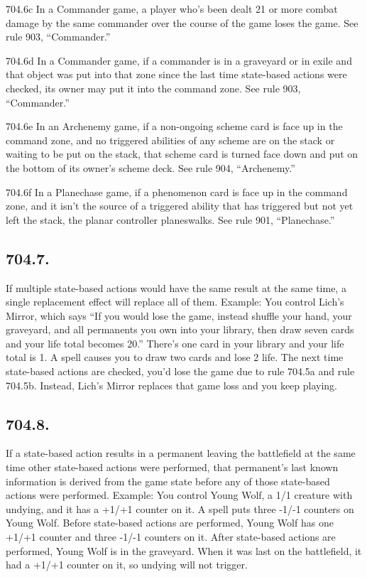 704.6c In a Commander game, a player who’s been dealt 21 or more combat damage by the same commander over the course of the game loses the game. See rule 903, “Commander.”

704.6d In a Commander game, if a commander is in a graveyard or in exile and that object was put into that zone since the last time state-based actions were checked, its owner may put it into the command zone. See rule 903, “Commander.”

704.6e In an Archenemy game, if a non-ongoing scheme card is face up in the command zone, and no triggered abilities of any scheme are on the stack or waiting to be put on the stack, that scheme card is turned face down and put on the bottom of its owner’s scheme deck. See rule 904, “Archenemy.”

704.6f In a Planechase game, if a phenomenon card is face up in the command zone, and it isn’t the source of a triggered ability that has triggered but not yet left the stack, the planar controller planeswalks. See rule 901, “Planechase.”

\subsection*{704.7.}
If multiple state-based actions would have the same result at the same time, a single replacement effect will replace all of them.
Example: You control Lich’s Mirror, which says “If you would lose the game, instead shuffle your hand, your graveyard, and all permanents you own into your library, then draw seven cards and your life total becomes 20.” There’s one card in your library and your life total is 1. A spell causes you to draw two cards and lose 2 life. The next time state-based actions are checked, you’d lose the game due to rule 704.5a and rule 704.5b. Instead, Lich’s Mirror replaces that game loss and you keep playing.

\subsection*{704.8.}
If a state-based action results in a permanent leaving the battlefield at the same time other state-based actions were performed, that permanent’s last known information is derived from the game state before any of those state-based actions were performed.
Example: You control Young Wolf, a 1/1 creature with undying, and it has a +1/+1 counter on it. A spell puts three -1/-1 counters on Young Wolf. Before state-based actions are performed, Young Wolf has one +1/+1 counter and three -1/-1 counters on it. After state-based actions are performed, Young Wolf is in the graveyard. When it was last on the battlefield, it had a +1/+1 counter on it, so undying will not trigger.

